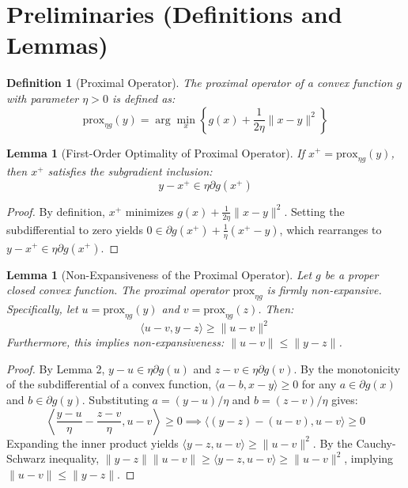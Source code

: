 \documentclass{article}
\newtheorem{lemma}[theorem]{Lemma}
\newtheorem{definition}[theorem]{Definition}
\begin{document}
\section*{Preliminaries (Definitions and Lemmas)}
\begin{definition}[Proximal Operator]
The proximal operator of a convex function $g$ with parameter $\eta > 0$ is defined as:
\begin{equation}
    \text{prox}_{\eta g}(y) = \arg\min_{x} \left\{ g(x) + \frac{1}{2\eta} \|x - y\|^2 \right\}
\end{equation}
\end{definition}

\begin{lemma}[First-Order Optimality of Proximal Operator]
If $x^+ = \text{prox}_{\eta g}(y)$, then $x^+$ satisfies the subgradient inclusion:
\begin{equation}
    y - x^+ \in \eta \partial g(x^+)
\end{equation}
\end{lemma}
\begin{proof}
By definition, $x^+$ minimizes $g(x) + \frac{1}{2\eta}\|x-y\|^2$. Setting the subdifferential to zero yields $0 \in \partial g(x^+) + \frac{1}{\eta}(x^+ - y)$, which rearranges to $y - x^+ \in \eta \partial g(x^+)$.
\end{proof}

\begin{lemma}[Non-Expansiveness of the Proximal Operator]
Let $g$ be a proper closed convex function. The proximal operator $\text{prox}_{\eta g}$ is firmly non-expansive. Specifically, let $u = \text{prox}_{\eta g}(y)$ and $v = \text{prox}_{\eta g}(z)$. Then:
\begin{equation}
    \langle u - v, y - z \rangle \geq \|u - v\|^2
\end{equation}
Furthermore, this implies non-expansiveness: $\|u - v\| \leq \|y - z\|$.
\end{lemma}
\begin{proof}
By Lemma 2, $y - u \in \eta \partial g(u)$ and $z - v \in \eta \partial g(v)$. By the monotonicity of the subdifferential of a convex function, $\langle a - b, x - y \rangle \geq 0$ for any $a \in \partial g(x)$ and $b \in \partial g(y)$. Substituting $a = (y-u)/\eta$ and $b = (z-v)/\eta$ gives:
\begin{equation}
    \left\langle \frac{y-u}{\eta} - \frac{z-v}{\eta}, u - v \right\rangle \geq 0 \implies \langle (y - z) - (u - v), u - v \rangle \geq 0
\end{equation}
Expanding the inner product yields $\langle y - z, u - v \rangle \geq \|u - v\|^2$. By the Cauchy-Schwarz inequality, $\|y - z\| \|u - v\| \geq \langle y - z, u - v \rangle \geq \|u - v\|^2$, implying $\|u - v\| \leq \|y - z\|$.
\end{proof}
\end{document}
